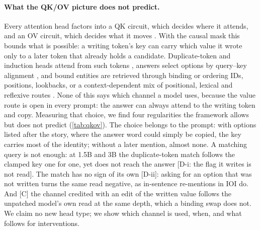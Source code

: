 
\paragraph{What the QK/OV picture does not predict.}
Every attention head factors into a QK circuit, which decides where it attends, and an OV circuit, which decides what it moves \citep{elhage2021framework}.
With the causal mask this bounds what is possible: a writing token's key can carry which value it wrote only to a later token that already holds a candidate.
Duplicate-token and induction heads attend from such tokens \citep{wang2022ioi,olsson2022context}, answers select options by query--key alignment \citep{lieberum2023chinchilla,wiegreffe2025answer,tulchinskii2024wise}, and bound entities are retrieved through binding or ordering IDs, positions, lookbacks, or a context-dependent mix of positional, lexical and reflexive routes \citep{feng2023binding,dai2024binding,prakash2024finetuning,prakash2025lookbacks,gurarieh2025mixing}.
None of this says which channel a model uses, because the value route is open in every prompt: the answer can always attend to the writing token and copy.
Measuring that choice, we find four regularities the framework allows but does not predict (\cref{tab:qkov}).
The choice belongs to the prompt: with options listed after the story, where the answer word could simply be copied, the key carries most of the identity; without a later mention, almost none.
A matching query is not enough: at 1.5B and 3B the duplicate-token match follows the clamped key one for one, yet does not reach the answer [D-i: the flag it writes is not read].
The match has no sign of its own [D-ii]: asking for an option that was not written turns the same read negative, as in-sentence re-mentions in IOI do.
And [C] the channel credited with an edit of the written value follows the unpatched model's own read at the same depth, which a binding swap does not.
We claim no new head type; we show which channel is used, when, and what follows for interventions.

